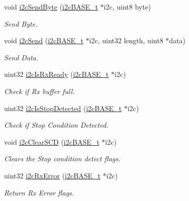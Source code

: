 \begin{DoxyCompactItemize}
void \mbox{\hyperlink{group__I2C_gab75d636550cd8d371e1204ee5040824a}{i2c\+Send\+Byte}} (\mbox{\hyperlink{reg__i2c_8h_a5d6c119fb20e803a530d0d4df544daf7}{i2c\+B\+A\+S\+E\+\_\+t}} $\ast$i2c, uint8 byte)
\begin{DoxyCompactList}\small\item\em Send Byte. \end{DoxyCompactList}\item 
void \mbox{\hyperlink{group__I2C_ga9f446d13bbe8b76a03f1e6ddcb1da36a}{i2c\+Send}} (\mbox{\hyperlink{reg__i2c_8h_a5d6c119fb20e803a530d0d4df544daf7}{i2c\+B\+A\+S\+E\+\_\+t}} $\ast$i2c, uint32 length, uint8 $\ast$data)
\begin{DoxyCompactList}\small\item\em Send Data. \end{DoxyCompactList}\item 
uint32 \mbox{\hyperlink{group__I2C_ga0ce73ebbc066986b3cbbd6c56fd14a9c}{i2c\+Is\+Rx\+Ready}} (\mbox{\hyperlink{reg__i2c_8h_a5d6c119fb20e803a530d0d4df544daf7}{i2c\+B\+A\+S\+E\+\_\+t}} $\ast$i2c)
\begin{DoxyCompactList}\small\item\em Check if Rx buffer full. \end{DoxyCompactList}\item 
uint32 \mbox{\hyperlink{group__I2C_ga529e9c7cd0d7d76c6604338a651f2d71}{i2c\+Is\+Stop\+Detected}} (\mbox{\hyperlink{reg__i2c_8h_a5d6c119fb20e803a530d0d4df544daf7}{i2c\+B\+A\+S\+E\+\_\+t}} $\ast$i2c)
\begin{DoxyCompactList}\small\item\em Check if Stop Condition Detected. \end{DoxyCompactList}\item 
void \mbox{\hyperlink{group__I2C_gaa381ceb41f9cae181b1e25f6094f5de0}{i2c\+Clear\+S\+CD}} (\mbox{\hyperlink{reg__i2c_8h_a5d6c119fb20e803a530d0d4df544daf7}{i2c\+B\+A\+S\+E\+\_\+t}} $\ast$i2c)
\begin{DoxyCompactList}\small\item\em Clears the Stop condition detect flags. \end{DoxyCompactList}\item 
uint32 \mbox{\hyperlink{group__I2C_ga2f5bd4c5af5a6ec9297c22d16f201630}{i2c\+Rx\+Error}} (\mbox{\hyperlink{reg__i2c_8h_a5d6c119fb20e803a530d0d4df544daf7}{i2c\+B\+A\+S\+E\+\_\+t}} $\ast$i2c)
\begin{DoxyCompactList}\small\item\em Return Rx Error flags. \end{DoxyCompactList}\item 

\end{DoxyCompactItemize}
